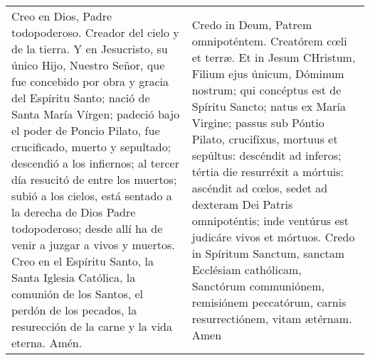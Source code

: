 \documentclass[../devocionario.tex]{subfiles}
\begin{document}
    \begin{longtable} { p{} p{} }
        Creo en Dios, Padre todopoderoso. Creador del cielo y de la tierra. Y en Jesucristo, su único Hijo, Nuestro Señor, 
        que fue concebido por obra y gracia del Espíritu Santo; nació de Santa María Vírgen; padeció bajo el poder de Poncio Pilato, 
        fue crucificado, muerto y sepultado; descendió a los infiernos; al tercer día resucitó de entre los muertos; subió a los cielos, 
        está sentado a la derecha de Dios Padre todopoderoso; desde allí ha de venir a juzgar a vivos y muertos. 
        Creo en el Espíritu Santo, la Santa Iglesia Católica, la comunión de los Santos, el perdón de los pecados, 
        la resurección de la carne y la vida eterna. Amén. &
        Credo in Deum, Patrem omnipoténtem. Creatórem cœli et terræ. Et in Jesum CHristum, Filium ejus únicum, Dóminum nostrum; 
        qui concéptus est de Spíritu Sancto; natus ex María Virgine; passus sub Póntio Pilato, crucifíxus, mortuus et sepúltus: 
        descéndit ad inferos; tértia die resurréxit a mórtuis: ascéndit ad cœlos, sedet ad dexteram Dei Patris omnipoténtis; 
        inde ventúrus est judicáre vivos et mórtuos. Credo in Spíritum Sanctum, sanctam Ecclésiam cathólicam, Sanctórum communiónem, 
        remisiónem peccatórum, carnis resurrectiónem, vitam ætérnam. Amen
    \end{longtable}
\end{document}
